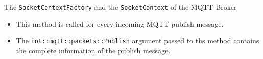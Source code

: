 \begin{frame}[fragile]{The \texttt{SocketContextFactory} and the \texttt{SocketContext} of the MQTT-Broker}
\begin{itemize}
\begin{itemize}
      \begin{cppcode}[gobble=8]
        void onPublish(iot::mqtt::packets::Publish& publish) override;
      \end{cppcode}
      \item This \textcolor{fh-ooe-red}{method is called for every incoming MQTT publish message}.
      \item The \textcolor{fh-ooe-red}{\texttt{iot::mqtt::packets::Publish}} argument passed to ths method \textcolor{fh-ooe-red}{contains the complete information of the publish message}.
    \end{itemize}
  \end{itemize}
\end{frame}
